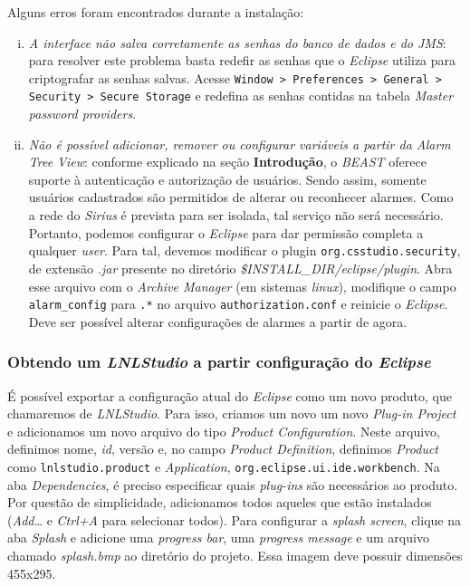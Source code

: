 Alguns erros foram encontrados durante a instalação:

\begin{enumerate}[i.]
  \item \textit{A interface não salva corretamente as senhas do banco de dados e
  do JMS}: para resolver este problema basta redefir as senhas que o
  \textit{Eclipse} utiliza para criptografar as senhas salvas. Acesse
  \texttt{Window > Preferences > General > Security > Secure Storage} e redefina
  as senhas contidas na tabela \textit{Master password providers}.

  \item \textit{Não é possível adicionar, remover ou configurar variáveis a
  partir da Alarm Tree View}: conforme explicado na seção \textbf{Introdução}, o
  \textit{BEAST} oferece suporte à autenticação e autorização de usuários. Sendo
  assim, somente usuários cadastrados são permitidos de alterar ou reconhecer
  alarmes. Como a rede do \textit{Sirius} é prevista para ser isolada, tal
  serviço não será necessário. Portanto, podemos configurar o \textit{Eclipse}
  para dar permissão completa a qualquer \textit{user}. Para tal, devemos
  modificar o plugin \texttt{org.csstudio.security}, de extensão \textit{.jar}
  presente no diretório \textit {\$INSTALL\_DIR/eclipse/plugin}. Abra esse
  arquivo com o \textit{Archive Manager} (em sistemas \textit{linux}),
  modifique o campo \texttt{alarm\_config} para \texttt{.*} no arquivo
  \texttt{authorization.conf} e reinicie o \textit{Eclipse}. Deve ser possível
  alterar configurações de alarmes a partir de agora.
\end{enumerate}

\subsubsection {Obtendo um \textit{LNLStudio} a partir configuração do
\textit{Eclipse}}

É possível exportar a configuração atual do \textit{Eclipse} como um novo
produto, que chamaremos de \textit{LNLStudio}. Para isso, criamos um novo um
novo \textit{Plug-in Project} e adicionamos um novo arquivo do tipo
\textit{Product Configuration}. Neste arquivo, definimos nome, \textit{id},
versão e, no campo \textit{Product Definition}, definimos \textit{Product} como
\texttt{lnlstudio.product} e \textit{Application},
\texttt{org.eclipse.ui.ide.workbench}. Na aba \textit{Dependencies}, é preciso
especificar quais \textit{plug-ins} são necessários ao produto. Por questão de
simplicidade, adicionamos todos aqueles que estão instalados
(\textit{Add\ldots} e \textit{Ctrl+A} para selecionar todos). Para configurar a
\textit{splash screen}, clique na aba \textit{Splash} e adicione uma
\textit{progress bar}, uma \textit{progress message} e um arquivo chamado
\textit{splash.bmp} ao diretório do projeto. Essa imagem deve possuir dimensões
455x295. 

